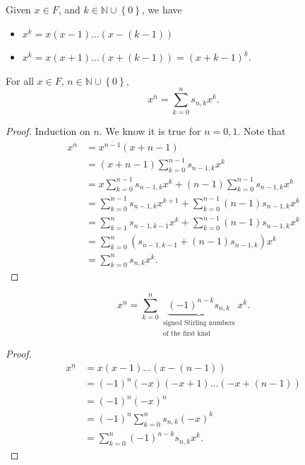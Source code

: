\begin{notation}
    Given \(x \in F\), and \(k \in \mathbb{N} \cup \left\{ 0 \right\} \), we have 
    \begin{itemize}
        \item \(x^{\underline{k}} = x(x-1)\dots (x-(k-1))\) 
        \item \(x^{\overline{k} } = x(x+1)\dots (x+(k-1)) = (x+k-1)^{\underline{k}}\).  
    \end{itemize}
\end{notation}

\begin{proposition} \label{prop: a summation formula for first kind of striling number}
    For all \(x \in F\), \(n \in \mathbb{N} \cup \left\{ 0 \right\} \), 
    \[
        x^{\overline{n} }= \sum_{k=0}^n s_{n,k} x^k. 
    \]  
\end{proposition}
\begin{proof}
    Induction on \(n\). We know it is true for \(n=0,1\). Note that 
    \begin{align*}
        x^{\overline{n} } &= x^{\overline{n-1}}(x+n-1) \\
        &= (x+n-1) \sum_{k=0}^{n-1} s_{n-1,k} x^k \\
        &= x \sum_{k=0}^{n-1}s_{n-1,k} x^k + (n-1) \sum_{k=0}^{n-1} s_{n-1, k} x^k \\
        &= \sum_{k=0}^{n-1} s_{n-1,k} x^{k+1} + \sum_{k=0}^{n-1}(n-1)s_{n-1,k}x^k \\
        &= \sum_{k=1}^n s_{n-1, k-1} x^{k} + \sum_{k=0}^{n-1}(n-1)s_{n-1,k}x^k \\
        &= \sum_{k=0}^n \left( s_{n-1,k-1}+(n-1)s_{n-1,k} \right) x^k \\
        &= \sum_{k=0}^n s_{n,k} x^k.          
    \end{align*} 
\end{proof}

\begin{corollary}
    \[
         x^{\underline{n}} = \sum_{k=0}^n \underbrace{(-1)^{n-k} s_{n,k}}_{\substack{\text{signed Stirling numbers} \\ \text{of the first kind}}}x^k .
    \]
\end{corollary}
\begin{proof}
    \begin{align*}
        x^{\underline{n}} &= x(x-1)\dots (x-(n-1)) \\
        &= (-1)^n (-x)(-x+1)\dots (-x+(n-1)) \\
        &=(-1)^n (-x)^{\overline{n} } \\
        &= (-1)^n \sum_{k=0}^n s_{n,k}(-x)^k \\
        &= \sum_{k=0}^n (-1)^{n-k} s_{n,k} x^k. 
    \end{align*}
\end{proof}